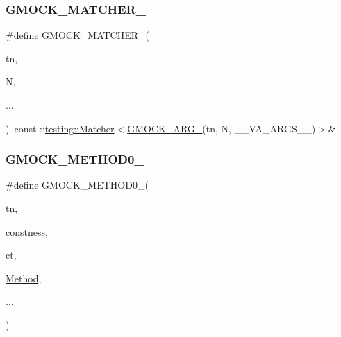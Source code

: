 \subsubsection{\texorpdfstring{GMOCK\_MATCHER\_}{GMOCK\_MATCHER\_}}
{\footnotesize\ttfamily \#define G\+M\+O\+C\+K\+\_\+\+M\+A\+T\+C\+H\+E\+R\+\_\+(\begin{DoxyParamCaption}\item[{}]{tn,  }\item[{}]{N,  }\item[{}]{... }\end{DoxyParamCaption})~const \+::\mbox{\hyperlink{classtesting_1_1_matcher}{testing\+::\+Matcher}}$<$\mbox{\hyperlink{_obj__test_2lib_2googletest-release-1_88_81_2googlemock_2include_2gmock_2gmock-generated-function-mockers_8h_a887575cc1c31158fba808180a10c004f}{G\+M\+O\+C\+K\+\_\+\+A\+R\+G\+\_\+}}(tn, N, \+\_\+\+\_\+\+V\+A\+\_\+\+A\+R\+G\+S\+\_\+\+\_\+)$>$\&}

\mbox{\label{googletest-master_2googlemock_2include_2gmock_2gmock-generated-function-mockers_8h_ae0d290ffa58d7c624b2e3487ba1252f4}} 
\subsubsection{\texorpdfstring{GMOCK\_METHOD0\_}{GMOCK\_METHOD0\_}}
{\footnotesize\ttfamily \#define G\+M\+O\+C\+K\+\_\+\+M\+E\+T\+H\+O\+D0\+\_\+(\begin{DoxyParamCaption}\item[{}]{tn,  }\item[{}]{constness,  }\item[{}]{ct,  }\item[{}]{\mbox{\hyperlink{_obj__test_2lib_2googletest-release-1_88_81_2googlemock_2test_2gmock-spec-builders__test_8cc_a95606368148f3e5aab5db46c32466afd}{Method}},  }\item[{}]{... }\end{DoxyParamCaption})}

